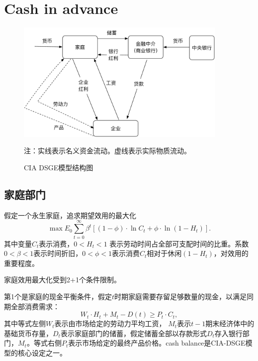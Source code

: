 \chapter{Cash in advance}
\label{sec:DSGECIA-intro}
\begin{figure}[htbp]
  \centering
  \includegraphics[width=4in]{./figures/20170324-CIA-outline}
 \caption{CIA DSGE模型结构图}
\label{fig:CIA-blueprint}

  \small{注：实线表示名义资金流动。虚线表示实际物质流动。}
\end{figure}

\section{家庭部门}
假定一个永生家庭，追求期望效用的最大化
\begin{equation}
  \label{eq:CIA-hh-max-util}
  \max%
  E_0 \sum_{t=0}^{\infty} \beta^t \left[ (1-\phi) \cdot \ln C_t + \phi \cdot \ln (1-H_t)\right].
\end{equation}
其中变量$ C_t$表示消费，$0<H_t<1$ 表示劳动时间占全部可支配时间的比重。系数$0<\beta<1$表示时间折旧，$0< \phi <1$表示消费$C_t$相对于休闲$(1-H_t)$，对效用的重要程度。

家庭效用最大化受到2+1个条件限制。

第1个是家庭的现金平衡条件，假定$t$时期家庭需要存留足够数量的现金，以满足同期全部消费需求：
\begin{equation}
  \label{eq:CIA-hh-cash-balance}
  W_t \cdot H_t + M_t - D(t) \ge P_t \cdot C_t,
\end{equation}
其中等式左侧$W_t$表示由市场给定的劳动力平均工资，%
$M_t$表示$t-1$期末经济体中的基础货币存量，$D_t$表示家庭部门的储蓄，假定储蓄全部以存款形式$D_t$存入银行部门，$M_t$。等式右侧$P_t$表示市场给定的最终产品价格。cash balance是CIA-DSGE模型的核心设定之一。

